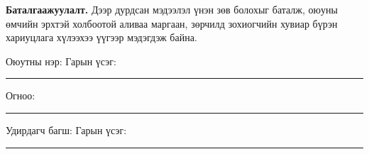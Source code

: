\bigskip
\noindent\textbf{Баталгаажуулалт.} Дээр дурдсан мэдээлэл үнэн зөв болохыг
баталж, оюуны өмчийн эрхтэй холбоотой аливаа маргаан, зөрчилд зохиогчийн
хувиар бүрэн хариуцлага хүлээхээ үүгээр мэдэгдэж байна.

\bigskip
\noindent Оюутны нэр: \shortname \hfill Гарын үсэг: \rule[-0.4em]{8em}{0.4pt}

\medskip
\noindent Огноо: \rule[-0.4em]{10em}{0.4pt}

\bigskip
\noindent Удирдагч багш: \supname \hfill Гарын үсэг: \rule[-0.4em]{8em}{0.4pt}

\clearpage
